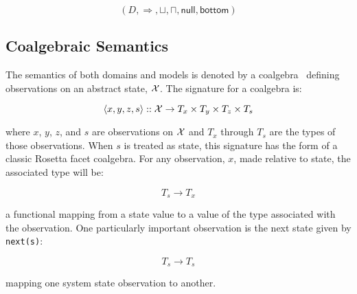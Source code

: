 \documentclass[12pt]{article}
\begin{document}
\[(D,\Rightarrow,\sqcup,\sqcap,\mathsf{null},\mathsf{bottom})\]

\subsection{Coalgebraic Semantics}

The semantics of both domains and models is denoted by a
coalgebra~\cite{Jacobs:97:A-Tutorial-on-C} defining observations on an abstract state,
$\mathcal X$.  The signature for a coalgebra is:

\[\langle x,y,z,s \rangle::\mathcal X \rightarrow
T_x\times T_y\times T_z\times T_s\]


\noindent where $x$, $y$, $z$, and $s$ are observations on $\mathcal X$ and $T_x$ through
$T_s$ are the types of those observations.  When $s$ is treated as state, this signature
has the form of a classic Rosetta facet coalgebra.  For any observation, $x$, made
relative to state, the associated type will be:

\[T_s\rightarrow T_x\]

\noindent a functional mapping from a state value to a value of the type associated with
the observation.  One particularly important observation is the next state given by
\lstinline!next(s)!:

\[T_s\rightarrow T_s\]

\noindent mapping one system state observation to another.

\end{document}

